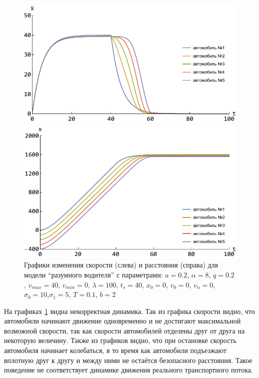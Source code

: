 \documentclass[12pt, a4paper]{extarticle}
\numberwithin{equation}{section}
\numberwithin{figure}{section}
\begin{document}
\begin{figure}[h!]
	\begin{center}
		\begin{minipage}[h!]{0.48\linewidth}
			\includegraphics[width=1\linewidth,height=0.2\textheight]
			{Images/treiber_model_speed.pdf}
		\end{minipage}
		\hfill 
		\begin{minipage}[h!]{0.48\linewidth}
			\includegraphics[width=1\linewidth,height=0.2\textheight]
			{Images/treiber_model_distance.pdf}
		\end{minipage}
		\caption{Графики изменения скорости (слева) и расстояния (справа) для модели ``разумного водителя'' с параметрами: $a=0.2$, $\alpha=8$, $q=0.2$, $v_{max}=40$, $v_{min}=0$, $\lambda=100$, $t_s=40$, $x_0=0$, $v_0=0$, $v_n=0$, $\sigma_0=10$,$\sigma_1=5$, $T=0.1$, $b=2$ }
		\label{treiber_model_img}
	\end{center}
\end{figure}

На графиках \ref{treiber_model_img} видна некорректная динамика. Так из графика скорости видно, что автомобили начинают движение одновременно и не достигают максимальной возможной скорости, так как скорости автомобилей отделены друг от друга на некоторую величину. Также из графиков видно, что при остановке скорость автомобиля начинает колебаться, в то время как автомобили подъезжают вплотную друг к другу и между ними не остаётся безопасного расстояния. Такое поведение не соответствует динамике движения реального транспортного потока. 
\end{document}
